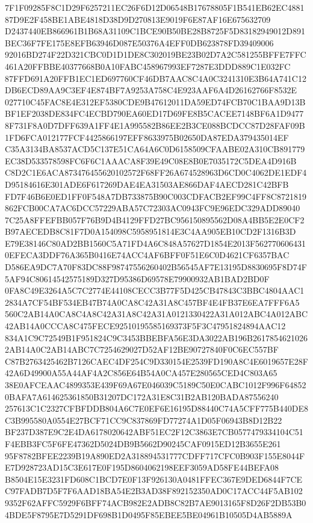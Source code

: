 \documentclass[UTF8,fontset=fandol,zihao=-4,a4paper]{ctexart}
\begin{document}
{{7F1F09285F8C1D29F6257211EC26F6D12D06548B17678805F1B541EB62EC488187D9E2F458BE1ABE4818D38D9D270813E9019F6E87AF16E675632709
D2437440EB866961B1B68A31109C1BCE90B50BE28B8725F5D83182949012D891BEC36F7FE175E8EFB63946D087E50376A4EFF0DB623878FD39409006
92016BD274F22D321CBC0D1D1DE8C302019BE23B02D7A2C581255BFFE7FFC461A20FFBBE40377668B0A10FABC458967993EF7287E3DDD889C1E032FC
87FFD691A20FFB1EC1ED697760CF46DB7AAC8C4A0C3241310E3B64A741C12DB6ECD89AA9C3EF4E874BF7A9253A758C4E923AAF6A4D26162766F8532E
027710C45FAC8E4E312EF5380CDE9B47612011DA59ED74FCB70C1BAA9D13BBF1EF2038DE834FC4ECBD790EA60ED17D69FE8B5CACEE7148BF6A1D9477
8F731F8A0D7DFF639A1FF4E1A995582B86EE2B3CE088BCDCC87D28FAF09B1FD6FCA012177FCF4425866197EFF8633975B02650DA87EDA379435014EF
C35A3134BA8537ACD5C137E51CA64A6C0D6158509CFAABE02A310CB891779EC38D533578598FC6F6C1AAACA8F39E49C08E8B0E7035172C5DEA4D916B
C8D2C1E6ACA873476455620102572F68FF26A674528963D6CD0C4062DE1EDF4D95184616E301ADE6F617269DAE4EA31503AE866DAF4AECD281C42BFB
FD7F46B6E0ED1FF0F548A7DB733875B90C003CDFACB2EF99C4FF8C8721819862FCB00CA7AC6DCC57229ABA57C72303AC0943FC9E96EDC329ADD89040
7C25A8FFEFBB057F76B9D4B4129FFD27BC956150895562D08A4BB5E2E0CF2B97AECEDB8C81F7D0A154098C5958951814E3C4AA905EB10CD2F1316B3D
E79E38146C80AD2BB1560C5A71FD4A6C848A57627D1854E2013F5627706064310EFECA3DDF76A365B0416E74ACC4AF6BFF0F51E6C0D4621CF6357BAC
D586EA9DC7A70F83DC88F98747556260402B56545AF7E13195D8830695F8D74F5AF94C80614542575189D327D95386D69578E79900932AB1BAD2BD0F
0FA8C49E3264A5C7C2774E44108CECC3B77F5D425CB47843C3BBC4804AAC12834A7CF54BF534EB47B74A0CA8C42A31A8C457BF4E4FB37E6EA7FFF6A5
560C2AB14A0CA8C4A8C42A31A8C42A31A0121330422A31A012ABC4A012ABC42AB14A0CCCA8C475FECE92510195585169373F5F3C47951824894AAC12
834A1C9C72549B1F951824C9C3453BBEBFA56E3DA3022AB196B26178546210262AB14A0C2AB14ABC7C7254629027D52AF12BE90727840F0C6EC557BF
C87B2763425462B7126CAEC4DF254C9D330154E2539FD190A8C4E6019657E28F42A6D49900A55A44AF4A2C856E64B54A0CA457E280565CED4C803A65
38E0AFCEAAC4899353E439F69A67E046039C5189C50E0CABC1012F996F648520BAFA7A614625361850B31207DC172A31E8C31B2AB120BADA87556240
257613C1C2327CFBFDDB804A6C7E0EF6E16195D88440C74A5CFF775B440DE8C3B995580A0554E27BCF71CC9C837869FD77274A1D05F06943B8D12B22
BF237D387E9C2E4DA6178020642ABF51EC2F12C3863E7CB0577479334104C51F4EBB3FC5F6FE47362D5024DB9B5662D90245CAF0915ED12B3655E261
95F8782BFEE2239B19A890ED2A318894531777CDFF717CFC0B903F155E8044FE7D928723AD15C3E617E0F195D8604062198EEF3059AD58FE44BEFA08
B8504E15E3231FD608C1BCD7E0F13F926130A0481FFEC367E9DED6844F7CEC97FADB7D5F7F6AAD18BA54E2B3AD38F892152350AD0C17ACC44F5AB102
9352F62AFFC5929F6BFF74ACB982E2ADB8C82B7AE9013165F8D26F2DB53B04BDE5F8795E7D5291DF698B1D0495F85EBEE5BE04961B10505D4AB5889A
}}
\end{document}
